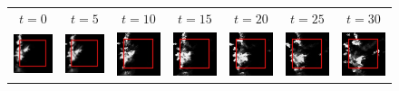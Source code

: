 \begin{figure}[h]
\begin{tabular}{lllllll}
\multicolumn{1}{c}{$t = 0$}  &
\multicolumn{1}{c}{$t = 5$}  &
\multicolumn{1}{c}{$t = 10$}  &
\multicolumn{1}{c}{$t = 15$}  &
\multicolumn{1}{c}{$t = 20$}  &
\multicolumn{1}{c}{$t = 25$}  &
\multicolumn{1}{c}{$t = 30$}  \\

\includegraphics[width=20mm]{abb/prediction/100_input_maxCont}&
\includegraphics[width=20mm]{abb/prediction/101_input_maxCont}&
\includegraphics[width=20mm]{abb/prediction/102_input_maxCont}&
\includegraphics[width=20mm]{abb/prediction/103_input_maxCont}&
\includegraphics[width=20mm]{abb/prediction/104_input_maxCont}&
\includegraphics[width=20mm]{abb/prediction/105_input_maxCont}&
\includegraphics[width=20mm]{abb/prediction/106_input_maxCont}\\


\end{tabular}
\end{figure}
